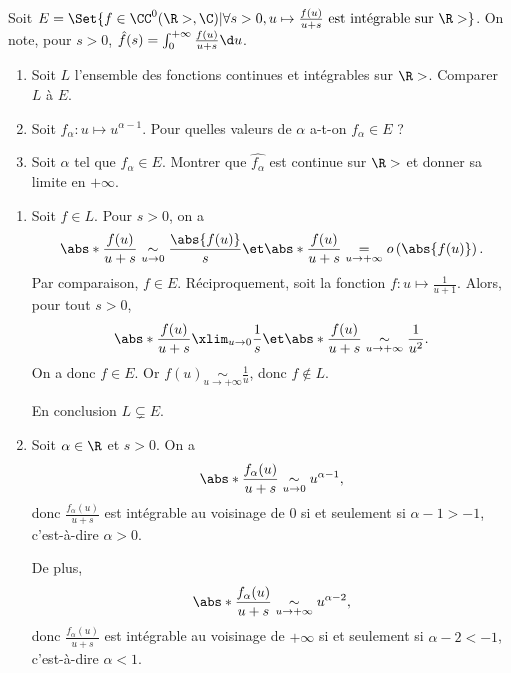 \begin{enonce}
\begin{exercise}[ID={RMS 120/683 Mines-Ponts PC},subtitle={},tags={}]
Soit $E=\Set{f\in\CC^0(\R>,\C) | \forall s>0, u\mapsto \frac{f(u)}{u+s} \text{ est intégrable sur }\R>}$.
    On note, pour $s>0$,
$\hat f(s)=\int_0^{+\infty} \frac{f(u)}{u+s}\d u$.

\begin{enumerate}
\item Soit $L$ l'ensemble des fonctions continues et intégrables sur $\R>$. Comparer $L$ à $E$.
\item Soit $f_\alpha:u\mapsto u^{\alpha-1}$. Pour quelles valeurs de $\alpha$ a-t-on $f_\alpha\in E$ ?
\item Soit $\alpha$ tel que $f_\alpha\in E$. Montrer que $\hat{f_\alpha}$ est continue sur $\R>$ et donner sa limite en $+\infty$.
\end{enumerate}
\end{exercise}
\begin{solution}
\begin{enumerate}
\item Soit $f\in L$.
Pour $s>0$, on a
\begin{equation*}
    \abs*{\frac{f(u)}{u+s}}\underset{u\to 0}\sim \frac{\abs{f(u)}}{s}
    \et
    \abs*{\frac{f(u)}{u+s}}\underset{u\to +\infty}= o\left(\abs{f(u)}\right).
\end{equation*}
Par comparaison, $f\in E$.
Réciproquement, soit la fonction $f:u\mapsto \frac{1}{u+1}$. Alors, pour tout $s>0$,
\begin{equation*}
    \abs*{\frac{f(u)}{u+s}}\xlim_{u\to 0} \frac1s
    \et
    \abs*{\frac{f(u)}{u+s}}\underset{u\to +\infty}\sim \frac{1}{u^2}.
\end{equation*}
On a donc $f\in E$. Or $f(u)\underset{u\to+\infty}\sim \frac1u$, donc $f\notin L$.

En conclusion $\boxed{L\subsetneq E}$.


\item Soit $\alpha\in\R$ et $s>0$. On a
\begin{equation*}
    \abs*{\frac{f_\alpha(u)}{u+s}}\underset{u\to 0}\sim u^{\alpha-1},
\end{equation*}
donc $\frac{f_\alpha(u)}{u+s}$ est intégrable au voisinage de $0$ si et seulement si $\alpha-1>-1$, c'est-à-dire $\alpha>0$.

De plus,
\begin{equation*}
    \abs*{\frac{f_\alpha(u)}{u+s}}\underset{u\to +\infty}\sim u^{\alpha-2},
\end{equation*}
donc $\frac{f_\alpha(u)}{u+s}$ est intégrable au voisinage de $+\infty$ si et seulement si $\alpha-2<-1$, c'est-à-dire $\alpha<1$.


\end{enumerate}
\end{solution}
\end{enonce}
